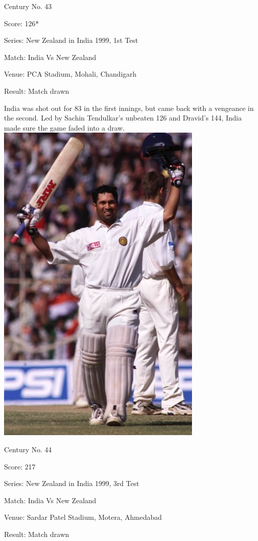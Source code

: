 \documentclass[11pt, a4paper]{article}
\begin{document}
Century No. 43 

Score: 126* 

Series: New Zealand in India 1999, 1st Test 

Match: India Vs New Zealand 

Venue: PCA Stadium, Mohali, Chandigarh 

Result: Match drawn 

India was shot out for 83 in the first innings, but came back with a vengeance in the second. Led by Sachin Tendulkar's unbeaten 126 and Dravid's 144, India made sure the game faded into a draw.
\newpage
\includegraphics[height=0.8\textheight]{pics/44.jpg}

Century No. 44 

Score: 217 

Series: New Zealand in India 1999, 3rd Test 

Match: India Vs New Zealand 

Venue: Sardar Patel Stadium, Motera, Ahmedabad 

Result: Match drawn 
\end{document}
